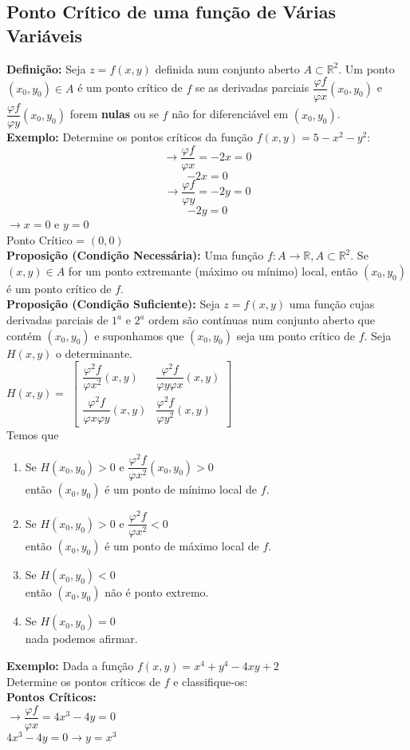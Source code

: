 \documentclass{article}
\begin{document}
	\subsection{Ponto Crítico de uma função de Várias Variáveis}
	\textbf{Definição:} Seja $z=f(x,y)$ definida num conjunto aberto $A \subset \mathbb{R}^2$. Um ponto $(x_0,y_0) \in A $ é um ponto crítico de $f$ se as derivadas parciais $\dfrac{\varphi f}{\varphi x}(x_0,y_0)$ e $\dfrac{\varphi f}{\varphi y}(x_0,y_0)$ forem \textbf{nulas} ou se $f$ não for diferenciável em  $(x_0,y_0)$.\\
	\textbf{Exemplo:} Determine os pontos críticos da função $f(x,y) = 5-x^2-y^2$:
	$$\to \dfrac{\varphi f}{\varphi x} = -2x = 0$$
	$$-2x = 0$$
	$$ \to \dfrac{\varphi f}{\varphi y} = -2y =0$$
	$$-2y =0$$
	$\to x = 0 $ e $y=0$\\
	Ponto Crítico = $(0,0)$\\
	\textbf{Proposição (Condição Necessária):}  Uma função $f:A\to \mathbb{R}, A \subset \mathbb{R}^2$. Se 	$(x,y) \in A$ for um ponto extremante (máximo ou mínimo) local, então $(x_0,y_0)$ é um ponto crítico de $f$.\\
	\textbf{Proposição (Condição Suficiente):} Seja $z=f(x,y)$ uma função cujas derivadas parciais de $1^a$ e $2^a$ ordem são contínuas num conjunto aberto que contém $(x_0,y_0)$ e suponhamos que $(x_0,y_0)$ seja um ponto crítico de $f$. Seja $H(x,y)$ o determinante.\\
	$H(x,y) = $ 
$
	\begin{bmatrix}
		\dfrac{\varphi ^2f}{\varphi x^2}(x,y) & \dfrac{\varphi ^2 f}{\varphi y \varphi x}(x,y)\\
		\dfrac{\varphi ^2f}{\varphi x \varphi y }(x,y) & \dfrac{\varphi ^2 f}{\varphi y^2}(x,y)
	\end{bmatrix}
$\\
	Temos que 
	\begin{enumerate}
		\item Se $H(x_0,y_0) > 0$ e $\dfrac{\varphi ^2f}{\varphi x^2}(x_0,y_0)>0$\\
		então $(x_0,y_0)$ é um ponto de mínimo local de $f$.
		\item Se $H(x_0,y_0)>0$ e $\dfrac{\varphi ^2f}{\varphi x^2}<0$\\
		então $(x_0,y_0)$ é um ponto de máximo local de $f$.
		\item Se $H(x_0,y_0)<0$\\
		então $(x_0,y_0)$ não é ponto extremo.
		\item Se $H(x_0,y_0)=0$\\
		nada podemos afirmar.
	\end{enumerate}
	\textbf{Exemplo:} Dada a função $f(x,y) = x^4 + y^4 - 4xy+2$\\
	Determine os pontos críticos de $f$ e classifique-os:\\
	\textbf{Pontos Críticos:}\\
		$\to \dfrac{\varphi f}{\varphi x} = 4x^3-4y=0$\\
		$4x^3-4y = 0 \to y = x^3$
		
\end{document}
